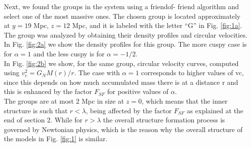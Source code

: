 \documentclass{article}
\begin{document}
Next, we found the groups in the system using a friendof-
friend algorithm and select one of the most massive
ones. The chosen group is located approximately at $y =
19$ Mpc, $z = 12$ Mpc, and it is labeled with the letter “G”
in Fig. \ref{fig:1a}. The group was analyzed by obtaining their
density profiles and circular velocities. In Fig. \ref{fig:2a} we show the density profiles for this group. The more cuspy
case is for $\alpha = 1$ and the less cuspy is for $\alpha = −1/2$.\\
In Fig. \ref{fig:2b} we show, for the same group, circular
velocity curves, computed using $v_{c}^{2}=G_{N} M(r)/r$. The
case with $\alpha = 1$ corresponds to higher values of vc, since this depends on how much accumulated mass there is at
a distance r and this is enhanced by the factor $F_{SF}$ for
positive values of $\alpha$.\\
The groups are at most 2 Mpc in size at $z = 0$, which
means that the inner structure is such that $r < \lambda$, being affected by the factor $F_{SF}$ as explained at the end of section 2. While for $r>\lambda$ the overall structure formation process is governed by Newtonian physics, which is the reason why the overall structure of the models in Fig. \ref{fig:1} is similar.
\end{document}
